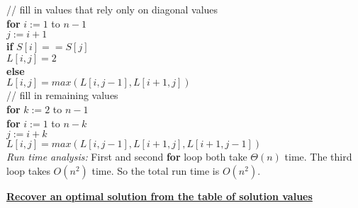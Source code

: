 \documentclass[11pt]{article}
\begin{document}
\begin{enumerate}
  \-\hspace{2em} // fill in values that rely only on diagonal values\\
  \-\hspace{2em} \textbf{for} $i := 1$ to $n-1$\\
  \-\hspace{4em} $j := i + 1$\\
  \-\hspace{4em} \textbf{if} $S[i] == S[j]$\\
  \-\hspace{6em} $L[i,j] = 2$\\
  \-\hspace{4em} \textbf{else}\\
  \-\hspace{6em} $L[i,j] = max(L[i,j-1], L[i+1,j])$\\

  \-\hspace{2em} // fill in remaining values \\
  \-\hspace{2em} \textbf{for} $k := 2$ to $n-1$\\
  \-\hspace{4em} \textbf{for} $i := 1$ to $n-k$\\
  \-\hspace{6em} $j := i + k$\\
  \-\hspace{6em} $L[i,j] = max(L[i,j-1], L[i+1,j], L[i+1,j-1])$\\

  \emph{Run time analysis:} First and second \textbf{for} loop both
  take $\Theta(n)$ time. The third loop takes $O(n^2)$ time. So the
  total run time is $O(n^2)$.

  \underline{\textbf{Recover an optimal solution from the table of
      solution values}}


\end{enumerate}
\end{document}
